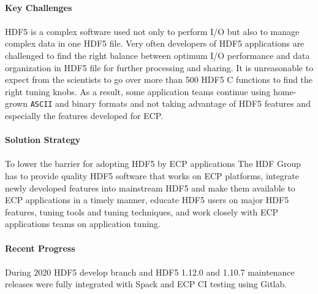\paragraph{Key  Challenges}
\paragraph{}

HDF5 is a complex software used not only to perform I/O but also to manage complex data in one HDF5 file. Very often developers of HDF5 applications are challenged to find the right balance between optimum I/O performance and data organization in HDF5 file for further processing and sharing. It is unreasonable to expect from the scientists to go over more than 500 HDF5 C functions to find the right tuning knobs. As a result, some application teams continue using home-grown \texttt{ASCII} and binary formats and not taking advantage of HDF5 features and especially the features developed for ECP.    

\paragraph{Solution Strategy}
\paragraph{}
To lower the barrier for adopting HDF5 by ECP applications The HDF Group has to provide quality HDF5 software that works on ECP platforms, integrate newly developed features into mainstream HDF5 and make them available to ECP applications in a timely manner, educate HDF5 users on major HDF5 features, tuning tools and tuning techniques, and work closely with ECP applications teams on application tuning.

\paragraph{Recent Progress}
\paragraph{}
During 2020 HDF5 develop branch and HDF5 1.12.0 and 1.10.7 maintenance releases were fully integrated with Spack and ECP CI testing using Gitlab. 


